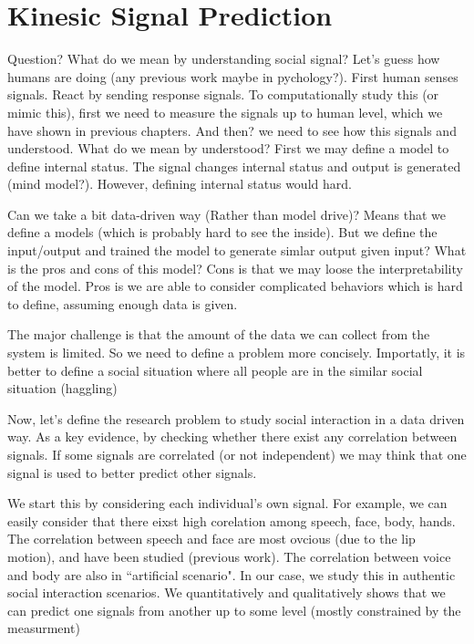 
\chapter{Kinesic Signal Prediction}
\label{chapter:prediction}


Question? What do we mean by understanding social signal? Let's guess how humans are doing (any previous work maybe in pychology?).  First human senses signals. React by sending response  signals. To computationally study this (or mimic this), first we need to measure the signals up to human level, which we have shown in previous chapters. And then? we need to see how this signals and understood. What do we mean by understood? First we may define a model to define internal status. The signal changes internal status and output is generated (mind model?). However, defining internal status would hard. 


Can we take a bit data-driven way (Rather than model drive)? Means that we define a models (which is probably hard to see the inside). But we define the input/output and trained the model to generate simlar output given input? What is the pros and cons of this model? Cons is that we may loose the interpretability of the model. Pros is we are able to consider complicated behaviors which is hard to define, assuming enough data is given. 


The major challenge is that the amount of the data we can collect from the system is limited. So we need to define a problem more concisely. Importatly, it is better to define a social situation where all people are in the similar social situation (haggling)


Now, let's define the research problem to study social interaction in a data driven way. As a key evidence, by checking whether there exist any correlation between signals. If some signals are correlated (or not independent) we may think that one signal is used to better predict other signals. 

We start this by considering each individual's own signal. For example, we can easily consider that there eixst high corelation among speech, face, body, hands. The correlation between speech and face are most ovcious (due to the lip motion), and have been studied (previous work). The correlation between voice and body are also in ``artificial scenario". In our case, we study this in authentic social interaction scenarios. We quantitatively and qualitatively shows that we can predict one signals from another up to some level (mostly constrained by the measurment)


